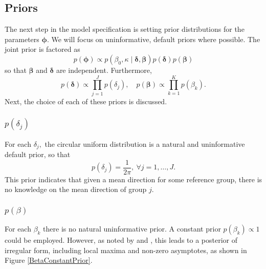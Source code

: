 \documentclass[11pt,a4paper]{article}\usepackage[]{graphicx}\usepackage[]{color}
\newcommand{\bdt}{\boldsymbol{\delta}}
\newcommand{\bbt}{\boldsymbol{\beta}}
\newcommand{\bph}{\boldsymbol{\phi}}
\begin{document}
\subsection{Priors}

The next step in the model specification is setting prior distributions for the parameters \( \bph \). We will focus on uninformative, default priors where possible. The joint prior is factored as
\begin{equation}
p(\bph) \propto p(\beta_0, \kappa \mid \bdt, \bbt) p(\bdt) p(\bbt)
\end{equation}
so that \( \bbt \) and \( \bdt \) are independent. Furthermore,
\begin{equation}
p(\bdt) \propto \prod_{j=1}^J p(\delta_j), \quad p(\bbt) \propto \prod_{k=1}^K p(\beta_k).
\end{equation}
Next, the choice of each of these priors is discussed.

\subsubsection{$p(\delta_j)$}

For each \( \delta_j,\)  the circular uniform distribution is a natural and uninformative default prior, so that
\begin{equation}
p(\delta_j) = \frac{1}{2 \pi}, ~ \forall j = 1, \dots, J.
\end{equation}
This prior indicates that given a mean direction for some reference group, there is no knowledge on the mean direction of group \( j.\)

\subsubsection{$p(\beta)$} \label{betaprior}

For each \(\beta_k\) there is no natural uninformative prior. A constant prior \( p(\beta_k) \propto 1 \) could be employed. However, as noted by \citet{fisher1995statistical} and \citet{gill2010}, this leads to a posterior of irregular form, including local maxima and non-zero asymptotes, as shown in Figure \ref{BetaConstantPrior}.
\end{document}
